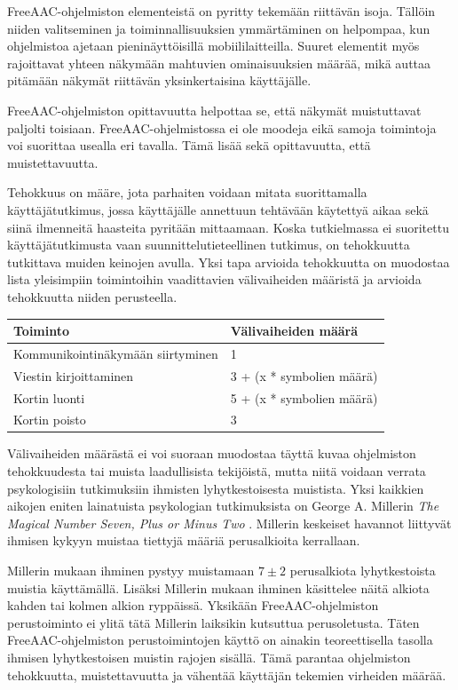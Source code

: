\documentclass[utf8]{gradu3}
\begin{document}
FreeAAC-ohjelmiston elementeistä on pyritty tekemään riittävän isoja. Tällöin niiden valitseminen ja toiminnallisuuksien ymmärtäminen on helpompaa, kun ohjelmistoa ajetaan pieninäyttöisillä mobiililaitteilla. Suuret elementit myös rajoittavat yhteen näkymään mahtuvien ominaisuuksien määrää, mikä auttaa pitämään näkymät riittävän yksinkertaisina käyttäjälle.

FreeAAC-ohjelmiston opittavuutta helpottaa se, että näkymät muistuttavat paljolti toisiaan. FreeAAC-ohjelmistossa ei ole moodeja eikä samoja toimintoja voi suorittaa usealla eri tavalla. Tämä lisää sekä opittavuutta, että muistettavuutta. 

Tehokkuus on määre, jota parhaiten voidaan mitata suorittamalla käyttäjätutkimus, jossa käyttäjälle annettuun tehtävään käytettyä aikaa sekä siinä ilmenneitä haasteita pyritään mittaamaan. Koska tutkielmassa ei suoritettu käyttäjätutkimusta vaan suunnittelutieteellinen tutkimus, on tehokkuutta tutkittava muiden keinojen avulla. Yksi tapa arvioida tehokkuutta on muodostaa lista yleisimpiin toimintoihin vaadittavien välivaiheiden määristä ja arvioida tehokkuutta niiden perusteella.

\begin{center}
    \begin{tabular}{| l | l |}
    \hline
    \textbf{Toiminto} & \textbf{Välivaiheiden määrä} \\ \hline
    Kommunikointinäkymään siirtyminen & 1  \\ \hline
    Viestin kirjoittaminen & 3 + (x * symbolien määrä)\\ \hline
    Kortin luonti & 5 + (x * symbolien määrä) \\ \hline
    Kortin poisto & 3  \\ \hline
    \end{tabular}
\end{center}

Välivaiheiden määrästä ei voi suoraan muodostaa täyttä kuvaa ohjelmiston tehokkuudesta tai muista laadullisista tekijöistä, mutta niitä voidaan verrata psykologisiin tutkimuksiin ihmisten lyhytkestoisesta muistista. Yksi kaikkien aikojen eniten lainatuista psykologian tutkimuksista \parencite[]{most-quoted-psych} on George A. Millerin \textit{The Magical Number Seven, Plus or Minus Two} \parencite[]{magical-number-seven}. Millerin keskeiset havannot liittyvät ihmisen kykyyn muistaa tiettyjä määriä perusalkioita kerrallaan.

Millerin mukaan ihminen pystyy muistamaan $7 \pm 2$ perusalkiota lyhytkestoista muistia käyttämällä. Lisäksi Millerin mukaan ihminen käsittelee näitä alkiota kahden tai kolmen alkion ryppäissä. Yksikään FreeAAC-ohjelmiston perustoiminto ei ylitä tätä Millerin laiksikin kutsuttua perusoletusta. Täten FreeAAC-ohjelmiston perustoimintojen käyttö on ainakin teoreettisella tasolla ihmisen lyhytkestoisen muistin rajojen sisällä. Tämä parantaa ohjelmiston tehokkuutta, muistettavuutta ja vähentää käyttäjän tekemien virheiden määrää.
\end{document}
